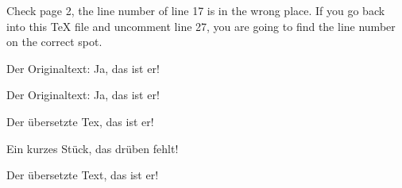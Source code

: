 \documentclass{book}
\begin{document}
Check page 2, the line number of line 17 is in the wrong place. If you go back into this \TeX{} file and uncomment line 27, you are going to find the line number on the correct spot.

\begin{pages}
\begin{Leftside}
\beginnumbering
{}

Der Originaltext: \blindtext[2] Ja, das ist er!
\pend

\pstart
\skipnumbering
\pend


Der Originaltext: \blindtext[2] Ja, das ist er!
\pend
\endnumbering   
\end{Leftside}

\begin{Rightside}
\beginnumbering
{}

Der übersetzte Tex, das ist er! \blindtext[3]
\pend

\pstart
Ein kurzes Stück, das drüben fehlt!
\pend


Der übersetzte Text, das ist er! \blindtext[2]
\pend
\endnumbering
\end{Rightside}
\end{pages}
\Pages
\end{document}
